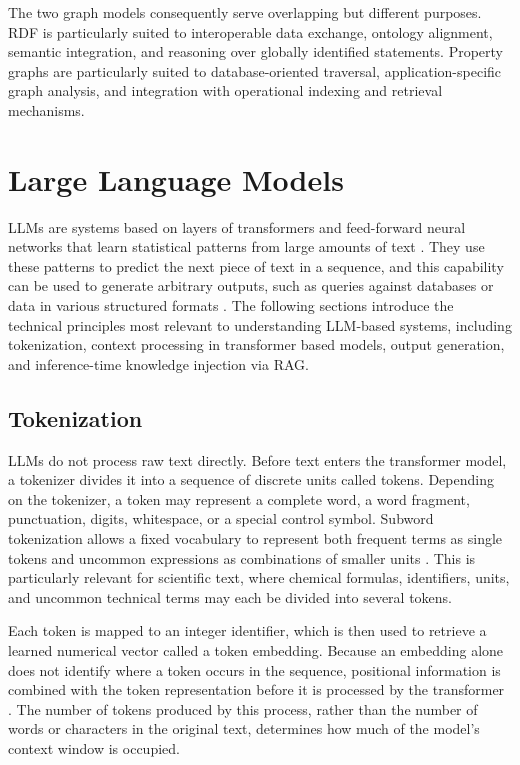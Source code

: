 The two graph models consequently serve overlapping but different purposes.
RDF is particularly suited to interoperable data exchange, ontology alignment, semantic integration, and reasoning over globally identified statements.
Property graphs are particularly suited to database-oriented traversal, application-specific graph analysis, and integration with operational indexing and retrieval mechanisms.



\section{Large Language Models}
\label{sec:large-language-models}
\acp{LLM} are systems based on layers of transformers and feed-forward neural networks that learn statistical patterns from large amounts of text \cite{zhao2026surveyllms,bommasani2021foundationmodels,vaswani2017attention}.
They use these patterns to predict the next piece of text in a sequence, and this capability can be used to generate arbitrary outputs, such as queries against databases or data in various structured formats \cite{brown2020language,dagdelen2024structured,zhang2024edc,oarga2026scientifickg}.
The following sections introduce the technical principles most relevant to understanding LLM-based systems, including tokenization, context processing in transformer based models, output generation, and inference-time knowledge injection via \ac{RAG}.

\subsection{Tokenization}
\label{subsec:tokenization}

LLMs do not process raw text directly.
Before text enters the transformer model, a tokenizer divides it into a sequence of discrete units called tokens.
Depending on the tokenizer, a token may represent a complete word, a word fragment, punctuation, digits, whitespace, or a special control symbol.
Subword tokenization allows a fixed vocabulary to represent both frequent terms as single tokens and uncommon expressions as combinations of smaller units \cite{kudo2018sentencepiece}.
This is particularly relevant for scientific text, where chemical formulas, identifiers, units, and uncommon technical terms may each be divided into several tokens.

Each token is mapped to an integer identifier, which is then used to retrieve a learned numerical vector called a token embedding.
Because an embedding alone does not identify where a token occurs in the sequence, positional information is combined with the token representation before it is processed by the transformer \cite{vaswani2017attention}.
The number of tokens produced by this process, rather than the number of words or characters in the original text, determines how much of the model's context window is occupied.

